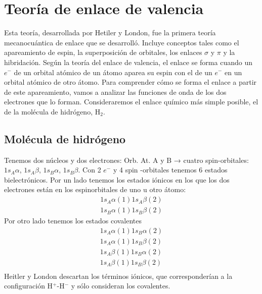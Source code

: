 \section{Teoría de enlace de valencia}
Esta teoría, desarrollada por Hetiler y London, fue la primera teoría mecanocuántica de enlace que se desarrolló. Incluye conceptos tales como el apareamiento de espin, la superposición de orbitales, los enlaces $\sigma$ y $\pi$ y la hibridación.
Según la teoría del enlace de valencia, el enlace se forma cuando un $e^-$ de un orbital atómico de un átomo aparea su espin con el de un $e^-$ en un orbital atómico de otro átomo.
Para comprender cómo se forma el enlace a partir de este apareamiento, vamos a analizar las funciones de onda de los dos electrones que lo forman.
Consideraremos el enlace químico más simple posible, el de la molécula de hidrógeno, H$_2$.

\subsection{Molécula de hidrógeno}
Tenemos dos núcleos y dos electrones: 
Orb. At. A y B → cuatro spin-orbitales: $1s_A\alpha$, $1s_A \beta$, $1s_B \alpha$, $1s_B \beta$.
Con 2 $e^-$ y 4 spin -orbitales  tenemos 6 estados bielectrónicos. Por un lado tenemos los estados iónicos en
los que los dos electrones están en los espinorbitales de uno u otro átomo:
\begin{equation*}
\begin{split}
    1s_A\alpha(1)1s_A\beta(2)\\
    1s_B\alpha(1)1s_B\beta(2)
\end{split}
\end{equation*}
Por otro lado tenemos los estados covalentes 
\begin{equation*}
\begin{split}
    1s_A\alpha(1)1s_B\alpha(2)\\
    1s_A\alpha(1)1s_B\beta(2)\\
    1s_A\beta(1)1s_B\alpha(2)\\
    1s_A\beta(1)1s_B\beta(2)\\
\end{split}
\end{equation*}
Heitler y London descartan los términos iónicos, que
corresponderían a
la configuración H$^+$-H$^-$ y sólo 
consideran los covalentes.